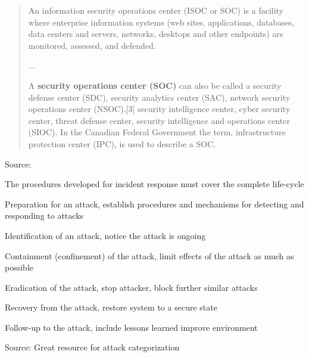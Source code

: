 \documentclass[Screen16to9,17pt]{foils}
\begin{document}
\begin{quote}
An information security operations center (ISOC or SOC) is a facility where enterprise information systems (web sites, applications, databases, data centers and servers, networks, desktops and other endpoints) are monitored, assessed, and defended.

...

A {\bf security operations center (SOC)} can also be called a security defense center (SDC), security analytics center (SAC), network security operations center (NSOC),[3] security intelligence center, cyber security center, threat defense center, security intelligence and operations center (SIOC). In the Canadian Federal Government the term, infrastructure protection center (IPC), is used to describe a SOC.
\end{quote}
Source: 




The procedures developed for incident response must cover the complete life-cycle

\begin{list2}
\item  Preparation for an attack, establish procedures and mechanisms for detecting and responding to attacks
\item  Identification of an attack, notice the attack is ongoing
\item  Containment (confinement) of the attack, limit effects of the attack as much as possible
\item  Eradication of the attack, stop attacker, block further similar attacks
\item  Recovery from the attack, restore system to a secure state
\item  Follow-up to the attack, include lessons learned  improve environment
\end{list2}




Source:  Great resource for attack categorization
\end{document}
